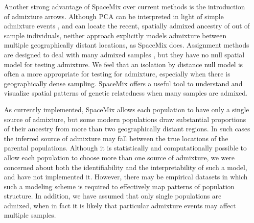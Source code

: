 \documentclass[12pt]{article}
\newcommand{\plr}[1]{{\it\color{purple}{(#1)}}}
\begin{document}

Another strong advantage of SpaceMix over current methods is the introduction of admixture arrows. 
Although PCA can be interpreted in light of simple admixture events \citep{mcvean_genealogical_2009}, 
and \citet{yang_model-based_2012,yang_spatial_2014} can locate the recent, spatially admixed ancestry of out of sample individuals,
neither approach explicitly models admixture between multiple geographically distant locations,
as SpaceMix does.
Assignment methods are designed to deal with many admixed samples \citep{STRUCTURE}, 
but they have no null spatial model for testing admixture.
We feel that an isolation by distance null model is often a more appropriate for testing for admixture, 
especially when there is geographically dense sampling. 
SpaceMix offers a useful tool to understand and visualize spatial patterns of genetic relatedness when many samples are admixed. 

As currently implemented, SpaceMix allows each population to have only a single source of admixture, 
but some modern populations draw substantial proportions of their ancestry from more than two geographically distant regions.
In such cases the inferred source of admixture may fall between the true locations of the parental populations.  
Although it is statistically and computationally possible to allow each population to choose more than one source of admixture, 
we were concerned about both the identifiability and the interpretability of such a model, and have not implemented it.
However, there may be empirical datasets in which such a modeling scheme is required to effectively map patterns of population structure.
In addition, we have assumed that only single populations are admixed, when in fact it is likely that particular admixture events may affect multiple samples.
\end{document}

